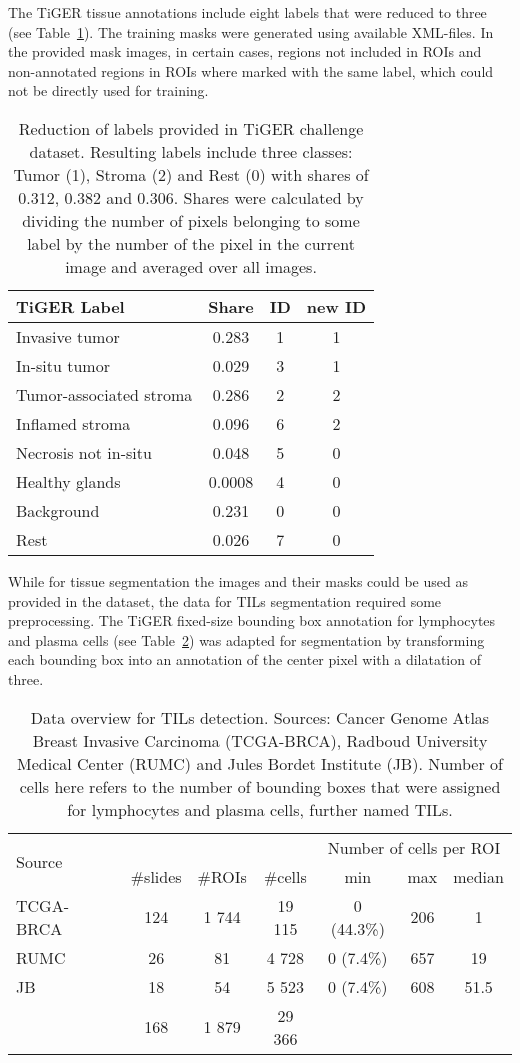 The TiGER tissue annotations include eight
labels that were reduced to three (see Table~\ref*{tab:label_data}).
The training masks were generated using available XML-files. In the provided mask
images, in certain cases, regions not included in ROIs and non-annotated regions in ROIs where
marked with the same label, which could not be directly used for training.
\begin{table}[h!]
\centering
\begin{tabular}{ l c c c } 
\hline
TiGER Label & Share & ID & new ID  \\ 
\hline
Invasive tumor & 0.283 & 1 & 1 \\ 
In-situ tumor & 0.029 & 3 & 1 \\ 
Tumor-associated stroma & 0.286 & 2 & 2\\
Inflamed stroma & 0.096 & 6 & 2\\
Necrosis not in-situ & 0.048 & 5 & 0\\
Healthy glands & 0.0008 & 4 & 0 \\ 
Background & 0.231 & 0 & 0 \\ 
Rest & 0.026 & 7 & 0\\
\hline
\end{tabular}
\caption{\label{tab:label_data} Reduction of labels provided in TiGER challenge dataset. Resulting labels include three classes: Tumor (1), Stroma (2) and Rest (0) with shares of 0.312, 0.382 and 0.306. Shares were calculated by dividing
the number of pixels belonging to some label by the number of the pixel in the current image and averaged over all images. }
\end{table}

While for tissue segmentation the images and their masks could be used as provided in the 
dataset, the data for TILs segmentation required some preprocessing. The TiGER fixed-size bounding box
annotation for lymphocytes and plasma cells (see Table~\ref*{tab:tils_data}) was adapted for segmentation by transforming each
bounding box into an annotation of the center pixel with a dilatation of three.
\begin{table}[h!]
\centering
\begin{tabular}{ l c c c c c c } 
\hline
\multirow{2}{*}{Source} & & & & \multicolumn{3}{c}{Number of cells per ROI}\\ 
\cline{2-7}
 & \#slides & \#ROIs & \#cells & min & max & median \\ 
\hline
TCGA-BRCA & 124 & 1 744 & 19 115 & 0 (44.3\%) & 206 & 1\\ 
RUMC & 26 & 81 & 4 728 & 0 (7.4\%) & 657 & 19\\ 
JB & 18 & 54 & 5 523 & 0 (7.4\%) & 608 & 51.5\\
\hline
 & 168 & 1 879 & 29 366 & & &\\
\end{tabular}
\caption{\label{tab:tils_data} Data overview for TILs detection. Sources: Cancer Genome Atlas Breast Invasive Carcinoma (TCGA-BRCA),
Radboud University Medical Center (RUMC) and Jules Bordet Institute (JB). Number of cells here refers to the number of
bounding boxes that were assigned for lymphocytes and plasma cells, further named TILs.}
\end{table}

